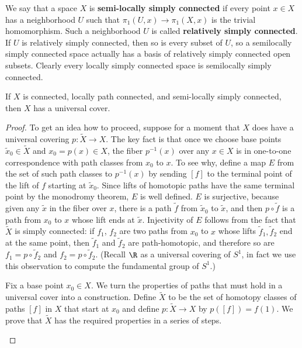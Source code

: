 We say that a space $X$ is \textbf{semi-locally simply connected} if every point $x\in X$ has a neighborhood $U$ such that $\pi_1(U,x)\to\pi_1(X,x)$ is the trivial homomorphism. Such a neighborhood $U$ is called \textbf{relatively simply connected}. If $U$ is relatively simply connected, then so is every subset of $U$, so a semilocally simply connected space actually has a basis of relatively simply connected open subsets. Clearly every locally simply connected space is semilocally simply connected.
\begin{theorem}\label{existence universal cover}
If $X$ is connected, locally path connected, and semi-locally simply connected, then $X$ has a universal cover.
\end{theorem}
\begin{proof}
To get an idea how to proceed, suppose for a moment that $X$ does have a
universal covering $p:\widetilde{X}\to X$. The key fact is that once we choose base points $\widetilde{x}_0\in\widetilde{X}$ and $x_0=p(x)\in X$, the fiber $p^{-1}(x)$ over any $x\in X$ is in one-to-one correspondence with path classes from $x_0$ to $x$. To see why, define a map $E$ from the set of such path classes to $p^{-1}(x)$ by sending $[f]$ to the terminal point of the lift of $f$ starting at $\widetilde{x}_0$. Since lifts of homotopic paths have the same terminal point by the monodromy theorem, $E$ is well defined. $E$ is surjective, because given any $\widetilde{x}$ in the fiber over $x$, there is a path $\widetilde{f}$ from $\widetilde{x}_0$ to $\widetilde{x}$, and then $p\circ\widetilde{f}$ is a path from $x_0$ to $x$ whose lift ends at $\widetilde{x}$. Injectivity of $E$ follows from the fact that $\widetilde{X}$ is simply connected: if $f_1$, $f_2$ are two paths from $x_0$ to $x$ whose lifts $\widetilde{f}_1,\widetilde{f}_2$ end at the same point, then $\widetilde{f}_1$ and $\widetilde{f}_2$ are path-homotopic, and therefore so are $f_1=p\circ\widetilde{f}_2$ and $f_2=p\circ\widetilde{f}_2$. (Recall $\R$ as a universal covering of $S^1$, in fact we use this observation to compute the fundamental group of $S^1$.)\par
Fix a base point $x_0\in X$. We turn the properties of paths that must hold in a universal cover into a construction. Define $\widetilde{X}$ to be the set of homotopy classes of paths $[f]$ in $X$ that start at $x_0$ and define $p:\widetilde{X}\to X$ by $p([f])=f(1)$. We prove that $\widetilde{X}$ has the required properties in a series of steps.\par
\begin{itemize}

\end{itemize}
\end{proof}
